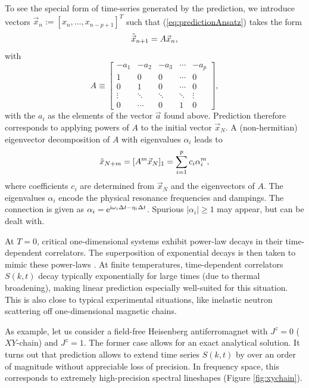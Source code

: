 \documentclass[a4paper,10pt,oneside,onecolumn,1p,times]{elsarticle}
\newcommand{\eul}{{\rm e }}
\newcommand{\imag}{{\rm i }}
\begin{document}
To see the special form of time-series generated by the prediction, 
we introduce vectors $\vec{x}_n := [x_{n}, \ldots, x_{n-p+1}]^T$ such that (\ref{eq:predictionAnsatz}) takes the form
\begin{equation}
\tilde{\vec{x}}_{n+1} = A \* \vec{x}_n,	
\end{equation}
 with 
\begin{equation}\label{eq:predictionMatrix}
A\equiv
\left[
\begin{array}{ccccc}
 -a_1&-a_2&-a_3&\cdots&-a_p\\
  1  & 0  & 0  &\cdots& 0  \\
  0  & 1  & 0  &\cdots& 0  \\
\vdots&\ddots&\ddots&\ddots&\vdots\\
  0   &\cdots& 0  & 1  & 0
\end{array}  
\right] ,
\end{equation}
with the $a_i$ as the elements of the vector $\vec{a}$ found above.
Prediction therefore corresponds to applying powers of $A$ to the initial vector $\vec{x}_N$. A (non-hermitian) eigenvector decomposition of $A$ with eigenvalues $\alpha_i$ leads to 
\begin{equation}
\tilde x_{N+m} = [A^m \* \vec{x}_N]_1=\sum_{i=1}^p c_i \alpha_i^m,
\end{equation}
where coefficients $c_i$ are determined from $\vec{x}_N$ and the eigenvectors of $A$. The eigenvalues $\alpha_i$ encode the physical resonance frequencies and dampings. The connection is given as
$\alpha_i = \eul^{\imag  \omega_i \Delta t - \eta_i \Delta t}$.
Spurious $|\alpha_i|\geq 1$ may appear, but can be dealt with\cite{Barthel09b}.

At $T=0$, critical one-dimensional systems exhibit power-law decays in their time-dependent correlators. The superposition of exponential decays is then taken to mimic these power-laws \cite{Pereira08}. At finite temperatures, time-dependent correlators $S(k,t)$ decay typically exponentially for large times (due to thermal broadening), making linear prediction especially well-suited for this situation. This is also close to typical experimental situations, like inelastic neutron scattering off one-dimensional magnetic chains.

As example, let us consider a field-free Heisenberg antiferromagnet with $J^z=0$ ($XY$-chain) and $J^z=1$. The former case allows for an exact analytical solution. It turns out that prediction allows to extend time series $S(k,t)$ by over an order of magnitude without appreciable loss of precision. In frequency  space, this corresponds to extremely high-precision spectral lineshapes (Figure \ref{fig:xychain}). 
\end{document}
